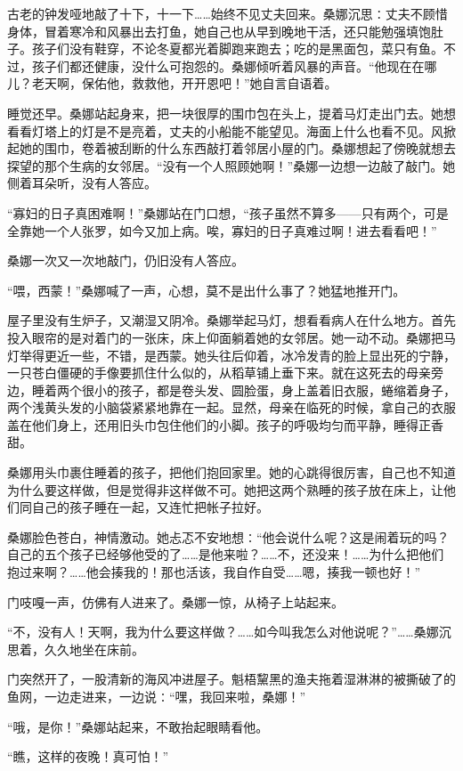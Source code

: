 \documentclass[12pt,UTF8]{ctexbook}
\begin{document}
古老的钟发哑地敲了十下，十一下……始终不见丈夫回来。桑娜沉思∶丈夫不顾惜身体，冒着寒冷和风暴出去打鱼，她自己也从早到晚地干活，还只能勉强填饱肚子。孩子们没有鞋穿，不论冬夏都光着脚跑来跑去；吃的是黑面包，菜只有鱼。不过，孩子们都还健康，没什么可抱怨的。桑娜倾听着风暴的声音。“他现在在哪儿？老天啊，保佑他，救救他，开开恩吧！”她自言自语着。

睡觉还早。桑娜站起身来，把一块很厚的围巾包在头上，提着马灯走出门去。她想看看灯塔上的灯是不是亮着，丈夫的小船能不能望见。海面上什么也看不见。风掀起她的围巾，卷着被刮断的什么东西敲打着邻居小屋的门。桑娜想起了傍晚就想去探望的那个生病的女邻居。“没有一个人照顾她啊！”桑娜一边想一边敲了敲门。她侧着耳朵听，没有人答应。

“寡妇的日子真困难啊！”桑娜站在门口想，“孩子虽然不算多——只有两个，可是全靠她一个人张罗，如今又加上病。唉，寡妇的日子真难过啊！进去看看吧！”

桑娜一次又一次地敲门，仍旧没有人答应。

“喂，西蒙！”桑娜喊了一声，心想，莫不是出什么事了？她猛地推开门。

屋子里没有生炉子，又潮湿又阴冷。桑娜举起马灯，想看看病人在什么地方。首先投入眼帘的是对着门的一张床，床上仰面躺着她的女邻居。她一动不动。桑娜把马灯举得更近一些，不错，是西蒙。她头往后仰着，冰冷发青的脸上显出死的宁静，一只苍白僵硬的手像要抓住什么似的，从稻草铺上垂下来。就在这死去的母亲旁边，睡着两个很小的孩子，都是卷头发、圆脸蛋，身上盖着旧衣服，蜷缩着身子，两个浅黄头发的小脑袋紧紧地靠在一起。显然，母亲在临死的时候，拿自己的衣服盖在他们身上，还用旧头巾包住他们的小脚。孩子的呼吸均匀而平静，睡得正香甜。

桑娜用头巾裹住睡着的孩子，把他们抱回家里。她的心跳得很厉害，自己也不知道为什么要这样做，但是觉得非这样做不可。她把这两个熟睡的孩子放在床上，让他们同自己的孩子睡在一起，又连忙把帐子拉好。

桑娜脸色苍白，神情激动。她忐忑不安地想∶“他会说什么呢？这是闹着玩的吗？自己的五个孩子已经够他受的了……是他来啦？……不，还没来！……为什么把他们抱过来啊？……他会揍我的！那也活该，我自作自受……嗯，揍我一顿也好！”

门吱嘎一声，仿佛有人进来了。桑娜一惊，从椅子上站起来。

“不，没有人！天啊，我为什么要这样做？……如今叫我怎么对他说呢？”……桑娜沉思着，久久地坐在床前。

门突然开了，一股清新的海风冲进屋子。魁梧黧黑的渔夫拖着湿淋淋的被撕破了的鱼网，一边走进来，一边说∶“嘿，我回来啦，桑娜！”

“哦，是你！”桑娜站起来，不敢抬起眼睛看他。

“瞧，这样的夜晚！真可怕！”
\end{document}
